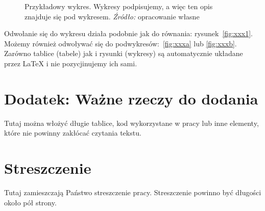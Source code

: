 \documentclass[polish, twoside, 12pt, a4paper]{article}
\theoremstyle{definition}
\theoremstyle{plain}
\theoremstyle{remark}
\begin{document}
\begin{figure}[hbt]
  \captionsetup{margin=10pt,font=small,labelfont=bf,width=.8\textwidth}

  \caption[Krótka nazwa II]{Przykładowy wykres. Wykresy podpisujemy, a więc ten opis znajduje się pod wykresem. \textit{Źródło:} opracowanie własne}\label{fig:xxx}
\end{figure}

Odwołanie się do wykresu działa podobnie jak do równania: rysunek~\ref{fig:xxx1}. Możemy również odwoływać się do podwykresów:~\ref{fig:xxxa} lub \ref{fig:xxxb}. Zarówno tablice (tabele) jak i rysunki (wykresy) są automatycznie układane przez \LaTeX{} i nie pozycjinujemy ich sami.


\appendix

\clearpage
\section{Dodatek: Ważne rzeczy do dodania}

Tutaj można włożyć długie tablice, kod wykorzystane w pracy lub inne elementy, które nie powinny zakłócać czytania tekstu.


\clearpage



\clearpage
{}
\listoftables

\clearpage
{}
\listoffigures



\clearpage
{}
\section*{Streszczenie}

Tutaj zamieszczają Państwo streszczenie pracy. Streszczenie powinno być długości około pół strony.
\end{document}
